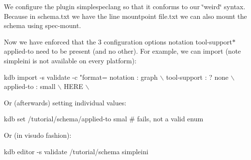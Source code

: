 We configure the plugin {\ttfamily simplespeclang} so that it conforms to our \char`\"{}weird\char`\"{} syntax. Because in {\ttfamily schema.\+txt} we have the line {\ttfamily mountpoint file.\+txt} we can also mount the schema using {\ttfamily spec-\/mount}.

Now we have enforced that the 3 configuration options {\ttfamily notation tool-\/support$\ast$ applied-\/to} need to be present (and no other). For example, we can import (note simpleini is not available on every platform)\+:


\begin{DoxyCode}
kdb import -s validate -c "format=%
notation : graph                                                            \(\backslash\)
tool-support : ? none                                                       \(\backslash\)
applied-to : small                                                          \(\backslash\)
HERE                                                                        \(\backslash\)
\end{DoxyCode}


Or (afterwards) setting individual values\+:


\begin{DoxyCode}
kdb set /tutorial/schema/applied-to smal # fails, not a valid enum
\end{DoxyCode}


Or (in {\ttfamily visudo} fashion)\+:


\begin{DoxyCode}
kdb editor -s validate /tutorial/schema simpleini
\end{DoxyCode}
 